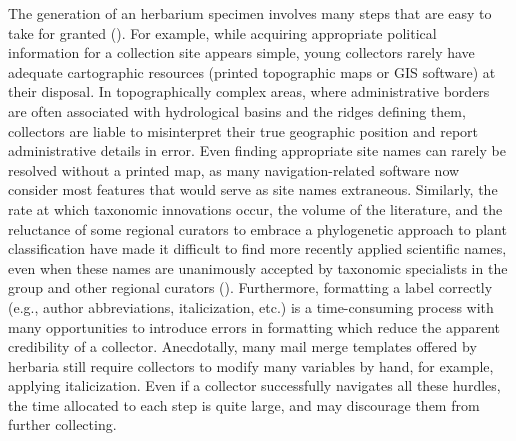 \documentclass[
]{article}
\begin{document}
The generation of an herbarium specimen involves many steps that are
easy to take for granted (). For example, while acquiring appropriate political
information for a collection site appears simple, young collectors
rarely have adequate cartographic resources (printed topographic maps or
GIS software) at their disposal. In topographically complex areas, where
administrative borders are often associated with hydrological basins and
the ridges defining them, collectors are liable to misinterpret their
true geographic position and report administrative details in error.
Even finding appropriate site names can rarely be resolved without a
printed map, as many navigation-related software now consider most
features that would serve as site names extraneous. Similarly, the rate
at which taxonomic innovations occur, the volume of the literature, and
the reluctance of some regional curators to embrace a phylogenetic
approach to plant classification have made it difficult to find more
recently applied scientific names, even when these names are unanimously
accepted by taxonomic specialists in the group and other regional
curators (). Furthermore, formatting a label correctly (e.g., author
abbreviations, italicization, etc.) is a time-consuming process with
many opportunities to introduce errors in formatting which reduce the
apparent credibility of a collector. Anecdotally, many mail merge
templates offered by herbaria still require collectors to modify many
variables by hand, for example, applying italicization. Even if a
collector successfully navigates all these hurdles, the time allocated
to each step is quite large, and may discourage them from further
collecting.
\end{document}
